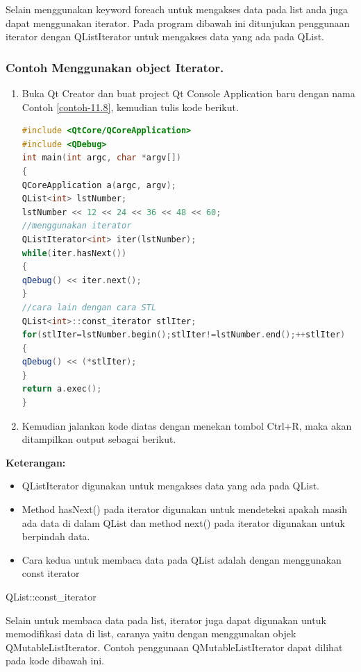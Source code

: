 Selain menggunakan keyword foreach untuk mengakses data pada list anda
juga dapat menggunakan iterator. Pada program dibawah ini ditunjukan
penggunaan iterator dengan QListIterator untuk mengakses data yang ada
pada QList.

\subsubsection*{Contoh  Menggunakan object Iterator.}

\begin{enumerate}

\item
  Buka Qt Creator dan buat project Qt Console Application baru dengan
  nama Contoh \ref{contoh-11.8}, kemudian tulis kode berikut.

\begin{lstlisting}[language=c++, caption=Menggunakan object Iterator, label=contoh-11.8]
#include <QtCore/QCoreApplication>
#include <QDebug>
int main(int argc, char *argv[])
{
QCoreApplication a(argc, argv);
QList<int> lstNumber;
lstNumber << 12 << 24 << 36 << 48 << 60;
//menggunakan iterator
QListIterator<int> iter(lstNumber);
while(iter.hasNext())
{
qDebug() << iter.next();
}
//cara lain dengan cara STL
QList<int>::const_iterator stlIter;
for(stlIter=lstNumber.begin();stlIter!=lstNumber.end();++stlIter)
{
qDebug() << (*stlIter);
}
return a.exec();
}
\end{lstlisting}
\item
  Kemudian jalankan kode diatas dengan menekan tombol Ctrl+R, maka akan
  ditampilkan output sebagai berikut.
\end{enumerate}

\textbf{Keterangan:}

\begin{itemize}

\item
  QListIterator digunakan untuk mengakses data yang ada pada QList.
\item
  Method hasNext() pada iterator digunakan untuk mendeteksi apakah masih
  ada data di dalam QList dan method next() pada iterator digunakan
  untuk berpindah data.
\item
  Cara kedua untuk membaca data pada QList adalah dengan menggunakan
  const iterator
\end{itemize}

QList::const\_iterator

Selain untuk membaca data pada list, iterator juga dapat digunakan untuk
memodifikasi data di list, caranya yaitu dengan menggunakan objek
QMutableListIterator. Contoh penggunaan QMutableListIterator dapat
dilihat pada kode dibawah ini.

